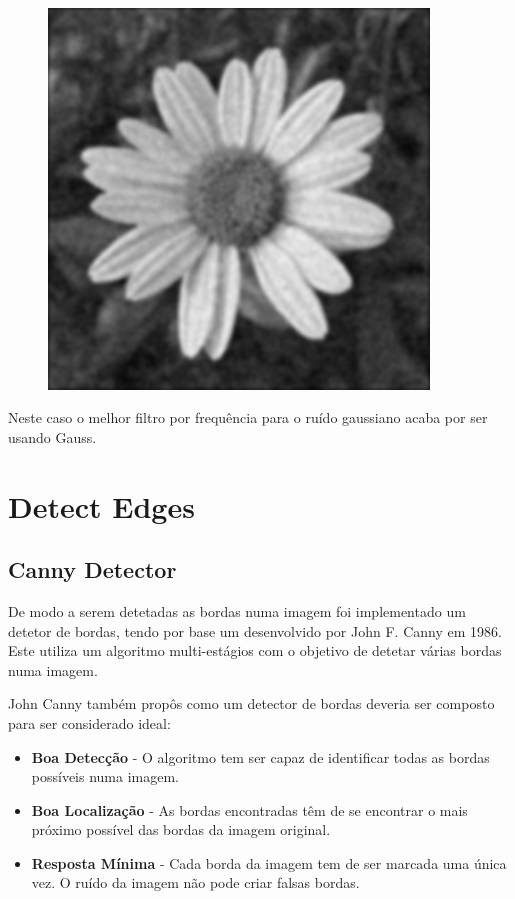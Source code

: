 \documentclass[a4paper]{report}
\begin{document}
\begin{figure}[H]
\begin{minipage}{.3\textwidth}
\end{minipage}%
\begin{minipage}{.3\textwidth}
  \centering
  \includegraphics[width=0.9\textwidth]{images/Smooth/frequency-gaussian/flower_smooth_frequency_Butterworth_2_80.png}
\end{minipage}
\end{figure}

Neste caso o melhor filtro por frequência  para o ruído gaussiano acaba por ser usando Gauss.

\chapter{Detect Edges}
\section{Canny Detector}
De modo a serem detetadas as bordas numa imagem foi implementado um detetor de
bordas, tendo por base um desenvolvido por John F. Canny em 1986. Este utiliza um algoritmo multi-estágios
com o objetivo de detetar várias bordas numa imagem.

John Canny também propôs como um detector de bordas deveria ser composto para ser
considerado ideal:
\begin{itemize}
    \item \textbf{Boa Detecção} - O algoritmo tem ser capaz de identificar todas as bordas possíveis numa imagem.
    \item \textbf{Boa Localização} - As bordas encontradas têm de se encontrar o mais próximo possível das bordas da imagem original.
    \item \textbf{Resposta Mínima} - Cada borda da imagem tem de ser marcada uma única vez. O ruído da imagem não pode criar falsas bordas.
\end{itemize}
\end{document}
